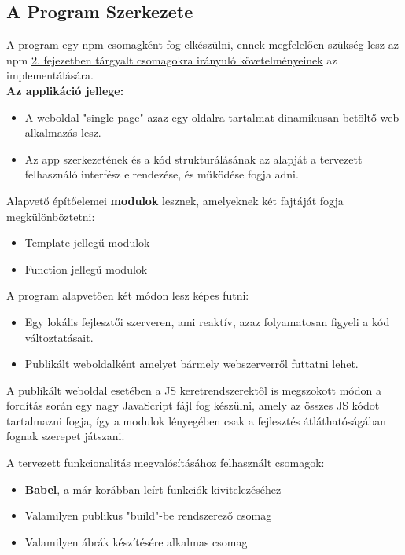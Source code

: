 \pagebreak

\subsection{A Program Szerkezete}

A program egy npm csomagként fog elkészülni, ennek megfelelően szükség lesz az npm \hyperlink{section2.2}{2. fejezetben tárgyalt csomagokra irányuló követelményeinek} az implementálására.\\

\textbf{Az applikáció jellege:}

\begin{itemize}
	\item A weboldal "single-page" azaz egy oldalra tartalmat dinamikusan betöltő web alkalmazás lesz.
	\item Az app szerkezetének és a kód strukturálásának az alapját a tervezett felhasználó interfész elrendezése, és működése fogja adni.
\end{itemize}

\noindent Alapvető építőelemei \textbf{modulok} lesznek, amelyeknek két fajtáját fogja megkülönböztetni:

\begin{itemize}
	\item Template jellegű modulok
	\item Function jellegű modulok
\end{itemize}

\noindent A program alapvetően két módon lesz képes futni:

\begin{itemize}
	\item Egy lokális fejlesztői szerveren, ami reaktív, azaz folyamatosan figyeli a kód változtatásait.
	\item Publikált weboldalként amelyet bármely webszerverről futtatni lehet.
\end{itemize}

\noindent A publikált weboldal esetében a JS keretrendszerektől is megszokott módon a fordítás során egy nagy JavaScript fájl fog készülni, amely az összes JS kódot tartalmazni fogja, így a modulok lényegében csak a fejlesztés átláthatóságában fognak szerepet játszani.

\noindent A tervezett funkcionalitás megvalósításához felhasznált csomagok:
\begin{itemize}
	\item \textbf{Babel}, a már korábban leírt funkciók kivitelezéséhez
	\item Valamilyen publikus "build"-be rendszerező csomag
	\item Valamilyen ábrák készítésére alkalmas csomag
\end{itemize}

